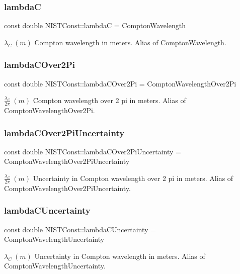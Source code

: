 \subsubsection{\texorpdfstring{lambdaC}{lambdaC}}
{\footnotesize\ttfamily const double N\+I\+S\+T\+Const\+::lambdaC = Compton\+Wavelength}

$\lambda_C \ (m)$ Compton wavelength in meters. Alias of Compton\+Wavelength. \mbox{\label{group___compton_wavelength_gadaf3906a9db23eece3ac4e130978a8ce}} 
\subsubsection{\texorpdfstring{lambda\+C\+Over2\+Pi}{lambdaCOver2Pi}}
{\footnotesize\ttfamily const double N\+I\+S\+T\+Const\+::lambda\+C\+Over2\+Pi = Compton\+Wavelength\+Over2\+Pi}

$\frac{\lambda_C}{2\pi} \ (m)$ Compton wavelength over 2 pi in meters. Alias of Compton\+Wavelength\+Over2\+Pi. \mbox{\label{group___compton_wavelength_ga6e5779d1afe643df1e5c28e97cfaf957}} 
\subsubsection{\texorpdfstring{lambda\+C\+Over2\+Pi\+Uncertainty}{lambdaCOver2PiUncertainty}}
{\footnotesize\ttfamily const double N\+I\+S\+T\+Const\+::lambda\+C\+Over2\+Pi\+Uncertainty = Compton\+Wavelength\+Over2\+Pi\+Uncertainty}

$\frac{\lambda_C}{2\pi} \ (m)$ Uncertainty in Compton wavelength over 2 pi in meters. Alias of Compton\+Wavelength\+Over2\+Pi\+Uncertainty. \mbox{\label{group___compton_wavelength_ga5de8d927be86c65e9e7d78f2c399cc49}} 
\subsubsection{\texorpdfstring{lambda\+C\+Uncertainty}{lambdaCUncertainty}}
{\footnotesize\ttfamily const double N\+I\+S\+T\+Const\+::lambda\+C\+Uncertainty = Compton\+Wavelength\+Uncertainty}

$\lambda_C \ (m)$ Uncertainty in Compton wavelength in meters. Alias of Compton\+Wavelength\+Uncertainty. 